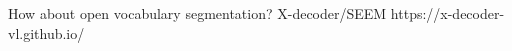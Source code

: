 \documentclass{article}
\begin{document}
How about open vocabulary segmentation? X-decoder/SEEM
https://x-decoder-vl.github.io/
\end{document}
